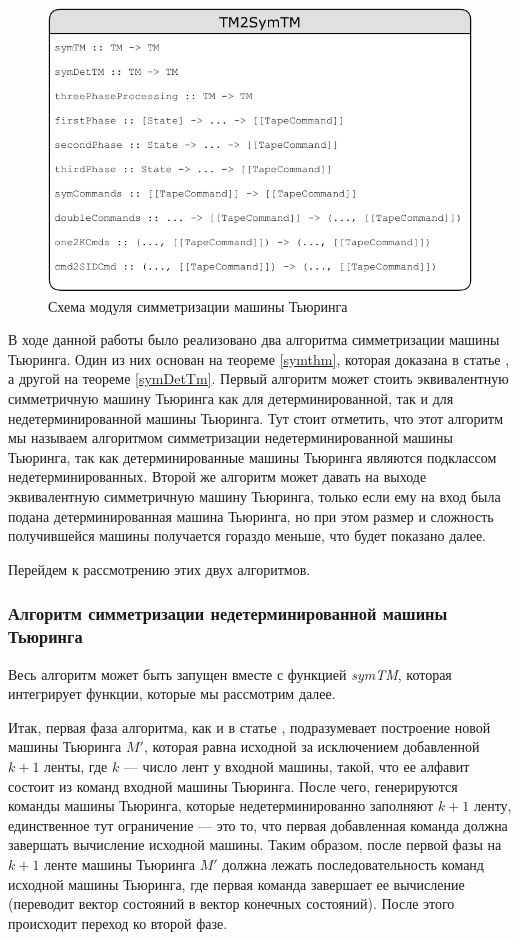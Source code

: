 \documentclass[14pt]{matmex-diploma-custom}
\begin{document}
\begin{figure}[H]
\centering
  \includegraphics[width=\linewidth]{pics/TM2SymTM.pdf}
  \caption{Схема модуля симметризации машины Тьюринга}
  \label{fig:TM2SymTM}
\end{figure}

В ходе данной работы было реализовано два алгоритма симметризации машины Тьюринга. Один из них основан на теореме \ref{symthm}, которая доказана в статье \cite{Sapir}, а другой на теореме \ref{symDetTm}. Первый алгоритм может стоить эквивалентную симметричную машину Тьюринга как для детерминированной, так и для недетерминированной машины Тьюринга. Тут стоит отметить, что этот алгоритм мы называем алгоритмом симметризации недетерминированной машины Тьюринга, так как детерминированные машины Тьюринга являются подклассом недетерминированных. Второй же алгоритм может давать на выходе эквивалентную симметричную машину Тьюринга, только если ему на вход была подана детерминированная машина Тьюринга, но при этом размер и сложность получившейся машины получается гораздо меньше, что будет показано далее.

Перейдем к рассмотрению этих двух алгоритмов.

\subsubsection{Алгоритм симметризации недетерминированной машины Тьюринга}
Весь алгоритм может быть запущен вместе с функцией \textit{symTM}, которая интегрирует функции, которые мы рассмотрим далее.

Итак, первая фаза алгоритма, как и в статье \cite{Sapir}, подразумевает построение новой машины Тьюринга $M'$, которая равна исходной за исключением добавленной $k+1$ ленты, где $k$ --- число лент у входной машины, такой, что ее алфавит состоит из команд входной машины Тьюринга. После чего, генерируются команды машины Тьюринга, которые недетерминированно заполняют $k+1$ ленту, единственное тут ограничение --- это то, что первая добавленная команда должна завершать вычисление исходной машины. Таким образом, после первой фазы на $k+1$ ленте машины Тьюринга $M'$ должна лежать последовательность команд исходной машины Тьюринга, где первая команда завершает ее вычисление (переводит вектор состояний в вектор конечных состояний). После этого происходит переход ко второй фазе. 
\end{document}
